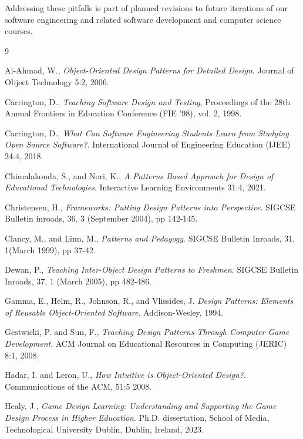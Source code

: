 \documentclass[conference]{IEEEtran}
\begin{document}
Addressing these pitfalls is part of planned revisions to future iterations of our software engineering and related software development and computer science courses.

\pagebreak

\begin{thebibliography}{9}

Al-Ahmad, W.,
\emph{Object-Oriented Design Patterns for Detailed Design}.
Journal of Object Technology 5:2, 2006.

Carrington, D.,
\emph{Teaching Software Design and Testing},
Proceedings of the 28th Annual Frontiers in Education Conference (FIE '98), vol. 2, 1998.

Carrington, D.,
\emph{What Can Software Engineering Students Learn from Studying Open Source Software?}.
International Journal of Engineering Education (IJEE) 24:4, 2018.

Chimalakonda, S., and Nori, K.,
\emph{A Patterns Based Approach for Design of Educational Technologies}.
Interactive Learning Environments 31:4, 2021.

Christensen, H.,
\emph{Frameworks: Putting Design Patterns into Perspective}.
SIGCSE Bulletin inroads, 36, 3 (September 2004), pp 142-145.

Clancy, M., and Linn, M.,
\emph{Patterns and Pedagogy}.
SIGCSE Bulletin Inroads, 31, 1(March 1999), pp 37-42.

Dewan, P.,
\emph{Teaching Inter-Object Design Patterns to Freshmen}.
SIGCSE Bulletin Inroads, 37, 1 (March 2005), pp 482-486.

Gamma, E., Helm, R., Johnson, R., and Vlissides, J.
\emph{Design Patterns: Elements of Reusable Object-Oriented Software}.
Addison-Wesley, 1994.

Gestwicki, P. and Sun, F.,
\emph{Teaching Design Patterns Through Computer Game Development}.
ACM Journal on Educational Resources in Computing (JERIC) 8:1, 2008.

Hadar, I. and Leron, U.,
\emph{How Intuitive is Object-Oriented Design?}.
Communications of the ACM, 51:5 2008.

Healy, J.,
\emph{Game Design Learning: Understanding and Supporting the Game Design Process in Higher Education}.
Ph.D. dissertation, School of Media, Technological University Dublin, Dublin, Ireland, 2023.


\end{thebibliography}
\end{document}
